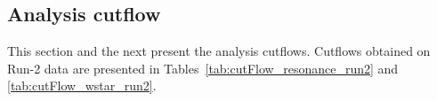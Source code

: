 %
%
%


\subsection{Analysis cutflow}

This section and the next present the analysis cutflows. Cutflows obtained on
Run-2 data are presented in Tables~\ref{tab:cutFlow_resonance_run2} and 
\ref{tab:cutFlow_wstar_run2}.


